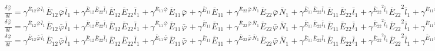 $\frac{{\delta}^{} {\bar{\varphi}}_{}}{{\delta} {{{t}}_{}}^{}} = {\gamma}^{{{{\bar{E}}_{12}}^{}{{\bar{\varphi}}_{}}^{}{{\bar{l}}_{1}}^{}}}{{{\bar{E}}_{12}}^{}{{\bar{\varphi}}_{}}^{}{{\bar{l}}_{1}}^{}} + {\gamma}^{{{{\bar{E}}_{12}}^{}{{\bar{E}}_{22}}^{}{{\bar{l}}_{1}}^{}}}{{{\bar{E}}_{12}}^{}{{\bar{E}}_{22}}^{}{{\bar{l}}_{1}}^{}} + {\gamma}^{{{{\bar{E}}_{11}}^{}{{\bar{\varphi}}_{}}^{}}}{{{\bar{E}}_{11}}^{}{{\bar{\varphi}}_{}}^{}} + {\gamma}^{{{{\bar{E}}_{11}}^{}}}{{{\bar{E}}_{11}}^{}} + {\gamma}^{{{{\bar{E}}_{22}}^{}{{\bar{\varphi}}_{}}^{}{{\bar{N}}_{1}}^{}}}{{{\bar{E}}_{22}}^{}{{\bar{\varphi}}_{}}^{}{{\bar{N}}_{1}}^{}} + {\gamma}^{{{{\bar{E}}_{11}}^{}{{\bar{E}}_{22}}^{}{{\bar{l}}_{1}}^{}}}{{{\bar{E}}_{11}}^{}{{\bar{E}}_{22}}^{}{{\bar{l}}_{1}}^{}} + {\gamma}^{{{{\bar{E}}_{22}}^{2}{{\bar{l}}_{1}}^{}}}{{{\bar{E}}_{22}}^{2}{{\bar{l}}_{1}}^{}} + {\gamma}^{{{{\bar{E}}_{11}}^{}{{\bar{\varphi}}_{}}^{}{{\bar{l}}_{1}}^{}}}{{{\bar{E}}_{11}}^{}{{\bar{\varphi}}_{}}^{}{{\bar{l}}_{1}}^{}} + {\gamma}^{{{{\bar{E}}_{11}}^{}{{\bar{\varphi}}_{}}^{}{{\bar{l}}_{2}}^{}}}{{{\bar{E}}_{11}}^{}{{\bar{\varphi}}_{}}^{}{{\bar{l}}_{2}}^{}} + {\gamma}^{{{{\bar{E}}_{22}}^{}{{\bar{\varphi}}_{}}^{}{{\bar{l}}_{2}}^{}}}{{{\bar{E}}_{22}}^{}{{\bar{\varphi}}_{}}^{}{{\bar{l}}_{2}}^{}}$
$\frac{{\delta}^{} {\bar{\varphi}}_{}}{{\delta} {{{t}}_{}}^{}} = {\gamma}^{{{{\bar{E}}_{12}}^{}{{\bar{\varphi}}_{}}^{}{{\bar{l}}_{1}}^{}}}{{{\bar{E}}_{12}}^{}{{\bar{\varphi}}_{}}^{}{{\bar{l}}_{1}}^{}} + {\gamma}^{{{{\bar{E}}_{12}}^{}{{\bar{E}}_{22}}^{}{{\bar{l}}_{1}}^{}}}{{{\bar{E}}_{12}}^{}{{\bar{E}}_{22}}^{}{{\bar{l}}_{1}}^{}} + {\gamma}^{{{{\bar{E}}_{11}}^{}{{\bar{\varphi}}_{}}^{}}}{{{\bar{E}}_{11}}^{}{{\bar{\varphi}}_{}}^{}} + {\gamma}^{{{{\bar{E}}_{11}}^{}}}{{{\bar{E}}_{11}}^{}} + {\gamma}^{{{{\bar{E}}_{22}}^{}{{\bar{\varphi}}_{}}^{}{{\bar{N}}_{1}}^{}}}{{{\bar{E}}_{22}}^{}{{\bar{\varphi}}_{}}^{}{{\bar{N}}_{1}}^{}} + {\gamma}^{{{{\bar{E}}_{11}}^{}{{\bar{E}}_{22}}^{}{{\bar{l}}_{1}}^{}}}{{{\bar{E}}_{11}}^{}{{\bar{E}}_{22}}^{}{{\bar{l}}_{1}}^{}} + {\gamma}^{{{{\bar{E}}_{22}}^{2}{{\bar{l}}_{1}}^{}}}{{{\bar{E}}_{22}}^{2}{{\bar{l}}_{1}}^{}} + {\gamma}^{{{{\bar{E}}_{11}}^{}{{\bar{\varphi}}_{}}^{}{{\bar{l}}_{1}}^{}}}{{{\bar{E}}_{11}}^{}{{\bar{\varphi}}_{}}^{}{{\bar{l}}_{1}}^{}} + {\gamma}^{{{{\bar{E}}_{11}}^{}{{\bar{\varphi}}_{}}^{}{{\bar{l}}_{2}}^{}}}{{{\bar{E}}_{11}}^{}{{\bar{\varphi}}_{}}^{}{{\bar{l}}_{2}}^{}}$
$\frac{{\delta}^{} {\bar{\varphi}}_{}}{{\delta} {{{t}}_{}}^{}} = {\gamma}^{{{{\bar{E}}_{12}}^{}{{\bar{\varphi}}_{}}^{}{{\bar{l}}_{1}}^{}}}{{{\bar{E}}_{12}}^{}{{\bar{\varphi}}_{}}^{}{{\bar{l}}_{1}}^{}} + {\gamma}^{{{{\bar{E}}_{12}}^{}{{\bar{E}}_{22}}^{}{{\bar{l}}_{1}}^{}}}{{{\bar{E}}_{12}}^{}{{\bar{E}}_{22}}^{}{{\bar{l}}_{1}}^{}} + {\gamma}^{{{{\bar{E}}_{11}}^{}{{\bar{\varphi}}_{}}^{}}}{{{\bar{E}}_{11}}^{}{{\bar{\varphi}}_{}}^{}} + {\gamma}^{{{{\bar{E}}_{11}}^{}}}{{{\bar{E}}_{11}}^{}} + {\gamma}^{{{{\bar{E}}_{22}}^{}{{\bar{\varphi}}_{}}^{}{{\bar{N}}_{1}}^{}}}{{{\bar{E}}_{22}}^{}{{\bar{\varphi}}_{}}^{}{{\bar{N}}_{1}}^{}} + {\gamma}^{{{{\bar{E}}_{11}}^{}{{\bar{E}}_{22}}^{}{{\bar{l}}_{1}}^{}}}{{{\bar{E}}_{11}}^{}{{\bar{E}}_{22}}^{}{{\bar{l}}_{1}}^{}} + {\gamma}^{{{{\bar{E}}_{22}}^{2}{{\bar{l}}_{1}}^{}}}{{{\bar{E}}_{22}}^{2}{{\bar{l}}_{1}}^{}} + {\gamma}^{{{{\bar{E}}_{11}}^{}{{\bar{\varphi}}_{}}^{}{{\bar{l}}_{1}}^{}}}{{{\bar{E}}_{11}}^{}{{\bar{\varphi}}_{}}^{}{{\bar{l}}_{1}}^{}}$
